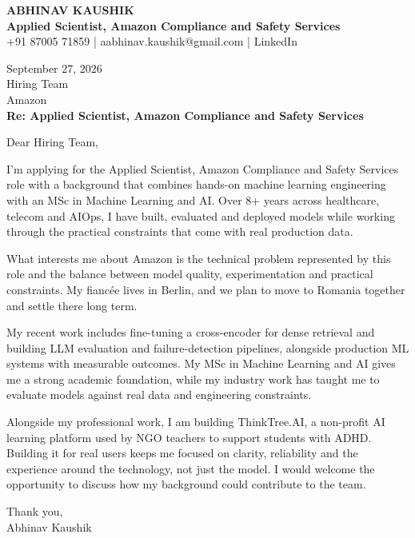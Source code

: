 \documentclass[10pt,a4paper]{article}
\begin{document}
\begin{center}
{\Large\bfseries ABHINAV KAUSHIK}\\[2pt]
{\bfseries Applied Scientist, Amazon Compliance and Safety Services}\\[2pt]
+91 87005 71859 \quad | \quad aabhinav.kaushik@gmail.com \quad | \quad LinkedIn
\end{center}
\vspace{8pt}
September 27, 2026\\[6pt]
Hiring Team\\
Amazon\\[4pt]
\textbf{Re: Applied Scientist, Amazon Compliance and Safety Services}

Dear Hiring Team,

I’m applying for the Applied Scientist, Amazon Compliance and Safety Services role with a background that combines hands-on machine learning engineering with an MSc in Machine Learning and AI. Over 8+ years across healthcare, telecom and AIOps, I have built, evaluated and deployed models while working through the practical constraints that come with real production data.

What interests me about Amazon is the technical problem represented by this role and the balance between model quality, experimentation and practical constraints. My fiancée lives in Berlin, and we plan to move to Romania together and settle there long term.

My recent work includes fine-tuning a cross-encoder for dense retrieval and building LLM evaluation and failure-detection pipelines, alongside production ML systems with measurable outcomes. My MSc in Machine Learning and AI gives me a strong academic foundation, while my industry work has taught me to evaluate models against real data and engineering constraints.

Alongside my professional work, I am building ThinkTree.AI, a non-profit AI learning platform used by NGO teachers to support students with ADHD. Building it for real users keeps me focused on clarity, reliability and the experience around the technology, not just the model. I would welcome the opportunity to discuss how my background could contribute to the team.

Thank you,\\
Abhinav Kaushik
\end{document}
